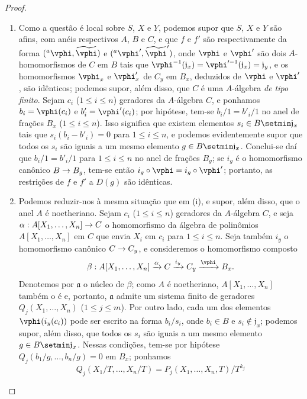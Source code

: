 \documentclass[oneside]{amsart}
\makeatletter
\renewcommand{\leq}{\leqslant}
\newcommand{\ega@arrow}[2]{\mathchoice{#1}{#2}{#2}{#2}}
\renewcommand{\to}{\ega@arrow{\longrightarrow}{\rightarrow}}
\makeatother
\begin{document}
\begin{proof}
\medskip\noindent
\begin{enumerate}
  \item[(i)] Como a questão é local sobre $S$, $X$ e $Y$, podemos supor que $S$, $X$ e $Y$ são afins, com anéis respectivos $A$, $B$ e $C$, e que $f$ e $f'$ são respectivamente da forma $({}^a\vphi,\widetilde{\vphi})$ e $({}^a\vphi',\widetilde{\vphi}')$, onde $\vphi$ e $\vphi'$ são dois $A$-homomorfismos de $C$ em $B$ tais que $\vphi^{-1}(\mathfrak{j}_x)=\vphi'^{-1}(\mathfrak{j}_x)=\mathfrak{j}_y$, e os homomorfismos $\vphi_x$ e $\vphi'_x$ de $C_y$ em $B_x$, deduzidos de $\vphi$ e $\vphi'$, são idênticos;
    podemos supor, além disso, que $C$ é uma $A$-álgebra \emph{de tipo finito}.
    Sejam $c_i$ ($1\leq i\leq n$) geradores da $A$-álgebra $C$, e ponhamos $b_i=\vphi(c_i)$ e $b'_i=\vphi'(c_i)$;
    por hipótese, tem-se $b_i/1=b'_i/1$ no anel de frações $B_x$ ($1\leq i\leq n$).
    Isso significa que existem elementos $s_i\in B\setmin\mathfrak{j}_x$ tais que $s_i(b_i-b'_i)=0$ para $1\leq i\leq n$, e podemos evidentemente supor que todos os $s_i$ são iguais a um mesmo elemento $g\in B\setmin\mathfrak{j}_x$.
    Conclui-se daí que $b_i/1=b'_i/1$ para $1\leq i\leq n$ no anel de frações $B_g$;
    se $i_g$ é o homomorfismo canônico $B\to B_g$, tem-se então $i_g\circ\vphi=i_g\circ\vphi'$;
    portanto, as restrições de $f$ e $f'$ a $D(g)$ são idênticas.
  \item[(ii)] Podemos reduzir-nos à mesma situação que em (i), e supor, além disso, que o anel $A$ é noetheriano.
    Sejam $c_i$ ($1\leq i\leq n$) geradores da $A$-álgebra $C$, e seja $\alpha:A[X_1,\ldots,X_n]\to C$ o homomorfismo da álgebra de polinômios $A[X_1,\ldots,X_n]$ em $C$ que envia $X_i$ em $c_i$ para $1\leq i\leq n$.
    Seja também $i_y$ o homomorfismo canônico $C\to C_y$, e consideremos o homomorfismo composto
    \[
      \beta:A[X_1,\ldots,X_n] \xrightarrow{\alpha} C \xrightarrow{i_y} C_y \xrightarrow{\vphi} B_x.
    \]
    Denotemos por $\mathfrak{a}$ o núcleo de $\beta$;
    como $A$ é noetheriano, $A[X_1,\ldots,X_n]$ também o é e, portanto, $\mathfrak{a}$ admite um sistema finito de geradores $Q_j(X_1,\ldots,X_n)$ ($1\leq j\leq m$).
    Por outro lado, cada um dos elementos $\vphi(i_y(c_i))$ pode ser escrito na forma $b_i/s_i$, onde $b_i\in B$ e $s_i\not\in\mathfrak{j}_x$;
    podemos supor, além disso, que todos os $s_i$ são iguais a um mesmo elemento $g\in B\setmin\mathfrak{j}_x$.
    Nessas condições, tem-se por hipótese $Q_j(b_1/g,\ldots,b_n/g)=0$ em $B_x$; ponhamos
    \[
      Q_j(X_1/T,\ldots,X_n/T)=P_j(X_1,\ldots,X_n,T)/T^{k_j}
\]
\end{enumerate}
\end{proof}
\end{document}
